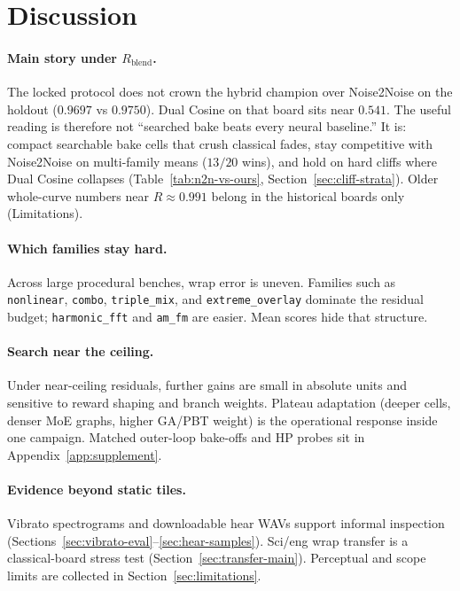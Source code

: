 \section{Discussion}
\label{sec:discussion}

\paragraph{Main story under $R_{\mathrm{blend}}$.}
The locked protocol does not crown the hybrid champion over Noise2Noise on the holdout
($0.9697$ vs $0.9750$).
Dual Cosine on that board sits near $0.541$.
The useful reading is therefore not ``searched bake beats every neural baseline.''
It is: compact searchable bake cells that crush classical fades, stay competitive with Noise2Noise on multi-family means ($13/20$ wins), and hold on hard cliffs where Dual Cosine collapses
(Table~\ref{tab:n2n-vs-ours}, Section~\ref{sec:cliff-strata}).
Older whole-curve numbers near $R{\approx}0.991$ belong in the historical boards only (Limitations).

\paragraph{Which families stay hard.}
Across large procedural benches, wrap error is uneven.
Families such as \texttt{nonlinear}, \texttt{combo}, \texttt{triple\_mix}, and \texttt{extreme\_overlay} dominate the residual budget; \texttt{harmonic\_fft} and \texttt{am\_fm} are easier.
Mean scores hide that structure.

\paragraph{Search near the ceiling.}
Under near-ceiling residuals, further gains are small in absolute units and sensitive to reward shaping and branch weights.
Plateau adaptation (deeper cells, denser MoE graphs, higher GA/PBT weight) is the operational response inside one campaign.
Matched outer-loop bake-offs and HP probes sit in Appendix~\ref{app:supplement}.

\paragraph{Evidence beyond static tiles.}
Vibrato spectrograms and downloadable hear WAVs support informal inspection (Sections~\ref{sec:vibrato-eval}--\ref{sec:hear-samples}).
Sci/eng wrap transfer is a classical-board stress test (Section~\ref{sec:transfer-main}).
Perceptual and scope limits are collected in Section~\ref{sec:limitations}.
